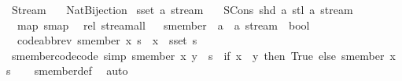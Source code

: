 %
\begin{isabellebody}%
%
%
\isadelimdocument
%
\endisadelimdocument
%
\isatagdocument
%
\isamarkuptrue%
%
\endisatagdocument
{\isafolddocument}%
%
\isadelimdocument
%
\endisadelimdocument
%
\isadelimtheory
%
\endisadelimtheory
%
\isatagtheory
{}\isamarkupfalse%
\ Stream\isanewline
\ \ \ Nat{\isacharunderscore}Bijection\isanewline
{}%
\endisatagtheory
{\isafoldtheory}%
%
\isadelimtheory
\isanewline
%
\endisadelimtheory
\isanewline
{}\isamarkupfalse%
\ {\isacharparenleft}sset{\isacharcolon}\ {\isacharprime}a{\isacharparenright}\ stream\ {\isacharequal}\isanewline
\ \ SCons\ {\isacharparenleft}shd{\isacharcolon}\ {\isacharprime}a{\isacharparenright}\ {\isacharparenleft}stl{\isacharcolon}\ {\isachardoublequoteopen}{\isacharprime}a\ stream{\isachardoublequoteclose}{\isacharparenright}\ {\isacharparenleft}\ {\isacartoucheopen}{\isacharhash}{\isacharhash}{\isacartoucheclose}\ {}{}{\isacharparenright}\isanewline
{}\isanewline
\ \ map{\isacharcolon}\ smap\isanewline
\ \ rel{\isacharcolon}\ stream{\isacharunderscore}all{}\isanewline
\isanewline
{}\isamarkupfalse%
\isanewline
{}\isanewline
\isanewline
%
\isanewline
{}\ \isamarkupfalse%
\ smember\ {\isacharcolon}{\isacharcolon}\ {\isachardoublequoteopen}{\isacharprime}a\ {\isasymRightarrow}\ {\isacharprime}a\ stream\ {\isasymRightarrow}\ bool{\isachardoublequoteclose}\ \isanewline
\ \ {\isacharbrackleft}code{\isacharunderscore}abbrev{\isacharbrackright}{\isacharcolon}\ {\isachardoublequoteopen}smember\ x\ s\ {\isasymlongleftrightarrow}\ x\ {\isasymin}\ sset\ s{\isachardoublequoteclose}\isanewline
\isanewline
{}\isamarkupfalse%
\ smember{\isacharunderscore}code{\isacharbrackleft}code{\isacharcomma}\ simp{\isacharbrackright}{\isacharcolon}\ {\isachardoublequoteopen}smember\ x\ {\isacharparenleft}y\ {\isacharhash}{\isacharhash}\ s{\isacharparenright}\ {\isacharequal}\ {\isacharparenleft}if\ x\ {\isacharequal}\ y\ then\ True\ else\ smember\ x\ s{\isacharparenright}{\isachardoublequoteclose}\isanewline
%
\isadelimproof
\ \ %
\endisadelimproof
%
\isatagproof
{}\isamarkupfalse%
\ smember{\isacharunderscore}def\ \isamarkupfalse%
\ auto%
\endisatagproof
{\isafoldproof}%
%
\isadelimproof
\isanewline

\end{isabellebody}
